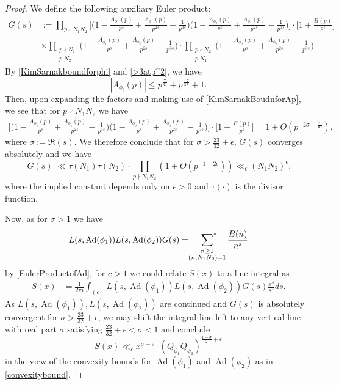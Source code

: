 \documentclass[10pt,a4paper]{amsart}
\newcommand{\Ad}{\operatorname{Ad}}
\newcommand{\psum}{\sideset{}{^*}\sum}
\begin{document}
\begin{proof}
    We define the following auxiliary Euler product:
    \begin{align*}
        G(s)  & := \prod_{p\nmid N_1N_2} \bigg[\bigg(1 - \frac{A_{\phi_1}(p)}{p^s} + \frac{A_{\phi_1}(p)}{p^{2s}} - \frac{1}{p^{3s}}\bigg) \bigg(1 - \frac{A_{\phi_2}(p)}{p^s} + \frac{A_{\phi_2}(p)}{p^{2s}} - \frac{1}{p^{3s}}\bigg)\bigg]\cdot \bigg[1 + \frac{B(p)}{p^s}\bigg] \\
        & \times \prod_{\substack{p\nmid N_1\\p|N_2}}\bigg(1 - \frac{A_{\phi_1}(p)}{p^s} + \frac{A_{\phi_1}(p)}{p^{2s}} - \frac{1}{p^{3s}}\bigg)\cdot 
        \prod_{\substack{p\nmid N_2\\p|N_1}}\bigg(1 - \frac{A_{\phi_2}(p)}{p^s} + \frac{A_{\phi_2}(p)}{p^{2s}} - \frac{1}{p^{3s}}\bigg)
    \end{align*}
    By \eqref{KimSarnakboundforphi} and \eqref{>3atp^2}, we have 
    \begin{equation}\label{KimSarnakBoudnforAp}
        |A_{\phi_i}(p)| \leq p^{\frac{7}{32}} + p^{\frac{-7}{32}} + 1.
    \end{equation}
    Then, upon expanding the factors and making use of \eqref{KimSarnakBoudnforAp}, we see that for $p\nmid N_1N_2$ we have
    \begin{align*}
        \bigg[\bigg(1 - \frac{A_{\phi_1}(p)}{p^s} + \frac{A_{\phi_1}(p)}{p^{2s}} - \frac{1}{p^{3s}}\bigg) \bigg(1 - \frac{A_{\phi_2}(p)}{p^s} + \frac{A_{\phi_2}(p)}{p^{2s}} - \frac{1}{p^{3s}}\bigg)\bigg]\cdot \bigg[1 + \frac{B(p)}{p^s}\bigg] 
        = 1 + O(p^{-2\sigma + \frac{7}{16}}),
    \end{align*}
    where $\sigma := \Re(s)$.
    We therefore conclude that for $\sigma > \frac{23}{32}+\epsilon$, $G(s)$ converges absolutely and we have
    \[
        |G(s)| \ll \tau(N_1)\tau(N_2)\cdot \prod_{p\nmid N_1N_2}(1 + O(p^{-1 - 2\epsilon})) \ll_{\epsilon} (N_1N_2)^{\epsilon},
    \]
    where the implied constant depends only on $\epsilon > 0$ and $\tau(\cdot)$ is the divisor function.
    
    Now, as for $\sigma > 1$ we have 
    \[
        L(s,\Ad(\phi_1))L(s,\Ad(\phi_2))G(s) = \psum_{\substack{n \geq 1 \\ (n,N_1N_2)=1}}\frac{B(n)}{n^s}
    \]
    by \eqref{EulerProductofAd}, for $c>1$ we could relate $S(x)$ to a line integral as
    \begin{align*}
        S(x) & = \frac{1}{2\pi i}\int_{(c)}L(s,\Ad(\phi_1))L(s,\Ad(\phi_2))G(s)\frac{x^s}{s^2}ds.
    \end{align*}
    As $L(s, \Ad(\phi_1)), L(s, \Ad(\phi_2))$ are continued and $G(s)$ is absolutely convergent for $\sigma > \frac{23}{32} + \epsilon$, we may shift the integral line left to any vertical line with real part $\sigma$ satisfying $\frac{23}{32} +\epsilon < \sigma <1$ and conclude
    \[
        S(x) \ll_{\epsilon} x^{\sigma+\epsilon}\cdot (Q_{\phi_1}Q_{\phi_2})^{\frac{1-\sigma}{2} + \epsilon}
    \]
    in the view of the convexity bounds for $\Ad(\phi_1)$ and $\Ad(\phi_2)$ as in \eqref{convexitybound}.
    
\end{proof}
\end{document}
